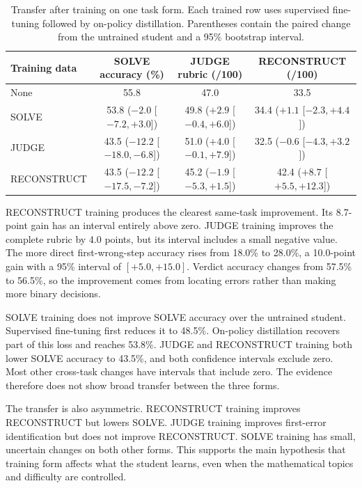 \documentclass[11pt]{article}
\begin{document}
\begin{table}[t]
\centering
\footnotesize
\setlength{\tabcolsep}{5pt}
\begin{tabular}{lccc}
\toprule
Training data & SOLVE accuracy (\%) & JUDGE rubric (/100) & RECONSTRUCT (/100) \\
\midrule
None & 55.8 & 47.0 & 33.5 \\
SOLVE & 53.8 ($-2.0$ [$-7.2,+3.0$]) & 49.8 ($+2.9$ [$-0.4,+6.0$]) & 34.4 ($+1.1$ [$-2.3,+4.4$]) \\
JUDGE & 43.5 ($-12.2$ [$-18.0,-6.8$]) & 51.0 ($+4.0$ [$-0.1,+7.9$]) & 32.5 ($-0.6$ [$-4.3,+3.2$]) \\
RECONSTRUCT & 43.5 ($-12.2$ [$-17.5,-7.2$]) & 45.2 ($-1.9$ [$-5.3,+1.5$]) & 42.4 ($+8.7$ [$+5.5,+12.3$]) \\
\bottomrule
\end{tabular}
\caption{Transfer after training on one task form. Each trained row uses supervised fine-tuning followed by on-policy distillation. Parentheses contain the paired change from the untrained student and a 95\% bootstrap interval.}
\label{tab:transfer-main}
\end{table}

RECONSTRUCT training produces the clearest same-task improvement. Its 8.7-point gain has an interval entirely above zero. JUDGE training improves the complete rubric by 4.0 points, but its interval includes a small negative value. The more direct first-wrong-step accuracy rises from 18.0\% to 28.0\%, a 10.0-point gain with a 95\% interval of $[+5.0,+15.0]$. Verdict accuracy changes from 57.5\% to 56.5\%, so the improvement comes from locating errors rather than making more binary decisions.

SOLVE training does not improve SOLVE accuracy over the untrained student. Supervised fine-tuning first reduces it to 48.5\%. On-policy distillation recovers part of this loss and reaches 53.8\%. JUDGE and RECONSTRUCT training both lower SOLVE accuracy to 43.5\%, and both confidence intervals exclude zero. Most other cross-task changes have intervals that include zero. The evidence therefore does not show broad transfer between the three forms.

The transfer is also asymmetric. RECONSTRUCT training improves RECONSTRUCT but lowers SOLVE. JUDGE training improves first-error identification but does not improve RECONSTRUCT. SOLVE training has small, uncertain changes on both other forms. This supports the main hypothesis that training form affects what the student learns, even when the mathematical topics and difficulty are controlled.
\end{document}
